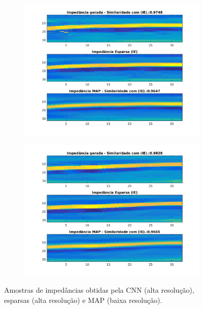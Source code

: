 \documentclass[11pt]{article}
\begin{document}
\begin{figure}[htp]
\begin{subfigure}{.5\textwidth}
  \caption{}
  \label{fig:sfig2}
\end{subfigure}
\begin{subfigure}{.5\textwidth}
  \centering
  \includegraphics[width=.9\linewidth]{fig/19}
  \caption{}
  \label{fig:sfig3}
\end{subfigure}
\begin{subfigure}{.5\textwidth}
  \centering
  \includegraphics[width=.9\linewidth]{fig/25}
  \caption{}
  \label{fig:sfig4}
\end{subfigure}
 \caption{Amostras de impedâncias obtidas pela CNN (alta resolução), esparsas (alta resolução) e MAP (baixa resolução).}
 \label{fig:sf}
\end{figure}
\end{document}
